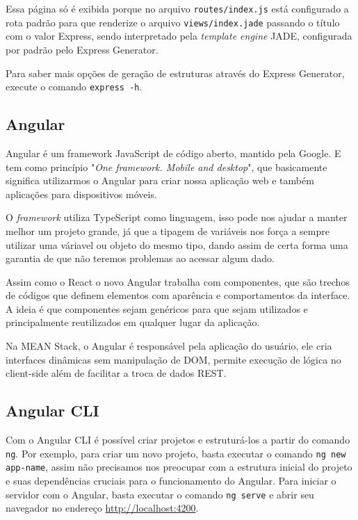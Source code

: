\documentclass[
	12pt,				%
	openright,			%
	twoside,			%
	a4paper,			%
	english,			%
	brazil				%
	]{abntex2}
\begin{document}
Essa página só é exibida porque no arquivo \verb|routes/index.js| está configurado a rota padrão para que renderize o arquivo \verb|views/index.jade| passando o título com o valor Express, sendo interpretado pela \textit{template engine} JADE, configurada por padrão pelo Express Generator.

Para saber mais opções de geração de estruturas através do Express Generator, execute o comando \verb|express -h|.

\subsection{Angular}

Angular é um framework JavaScript de código aberto, mantido pela Google. E tem como princípio "\textit{One framework. Mobile and desktop}", que basicamente significa utilizarmos o Angular para criar nossa aplicação web e também aplicações para dispositivos móveis.

O \textit{framework} utiliza TypeScript como linguagem, isso pode nos ajudar a manter melhor um projeto grande, já que a tipagem de variáveis nos força a sempre utilizar uma váriavel ou objeto do mesmo tipo, dando assim de certa forma uma garantia de que não teremos problemas ao acessar algum dado.


Assim como o React o novo Angular trabalha com componentes, que são trechos de códigos que definem elementos com aparência e comportamentos da interface. A ideia é que componentes sejam genéricos para que sejam utilizados e principalmente reutilizados em qualquer lugar da aplicação.

Na MEAN Stack, o Angular é responsável pela aplicação do usuário, ele cria interfaces dinâmicas sem manipulação de DOM, permite execução de lógica no client-side além de facilitar a troca de dados REST.

\subsection{Angular CLI} 


Com o Angular CLI é possível criar projetos e estruturá-los a partir do comando \verb|ng|. Por exemplo, para criar um novo projeto, basta executar o comando \verb|ng new app-name|, assim não precisamos nos preocupar com a estrutura inicial do projeto e suas dependências cruciais para o funcionamento do Angular. Para iniciar o servidor com o Angular, basta executar o comando \verb|ng serve| e abrir seu navegador no endereço \href{http://localhost:4200}{http://localhost:4200}.
\end{document}
